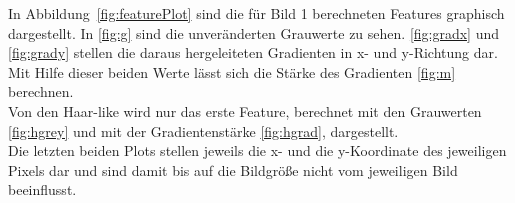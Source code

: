 \documentclass[]{report}
\begin{document}
\begin{enumerate}
					In Abbildung~\ref{fig:featurePlot} sind die für Bild 1 berechneten Features graphisch dargestellt. In \ref{fig:g} sind die unveränderten Grauwerte zu sehen. \ref{fig:gradx} und \ref{fig:grady} stellen die daraus hergeleiteten Gradienten in x- und y-Richtung dar. Mit Hilfe dieser beiden Werte lässt sich die Stärke des Gradienten \ref{fig:m} berechnen. \\
					Von den Haar-like wird nur das erste Feature, berechnet mit den Grauwerten \ref{fig:hgrey} und mit der Gradientenstärke \ref{fig:hgrad}, dargestellt.
					\\
					Die letzten beiden Plots stellen jeweils die x- und die y-Koordinate des jeweiligen Pixels dar und sind damit bis auf die Bildgröße nicht vom jeweiligen Bild beeinflusst.
						

\end{enumerate}
\end{document}
